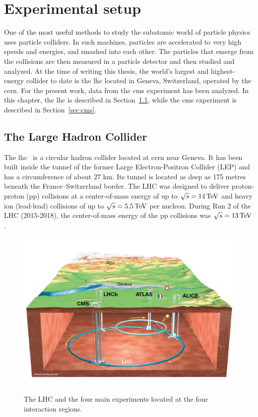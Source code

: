 \chapter{Experimental setup}
\label{sec:experimental-setup}

One of the most useful methods to study the subatomic world of particle physics uses particle colliders. In such machines, particles are accelerated to very high speeds and energies, and smashed into each other. The particles that emerge from the collisions are then measured in a particle detector and then studied and analyzed. At the time of writing this thesis, the world's largest and highest-energy collider to date is the \gls{lhc} located in Geneva, Switzerland, operated by the \gls{cern}. For the present work, data from the \gls{cms} experiment has been analyzed. In this chapter, the \gls{lhc} is described in Section~\ref{sec:lhc}, while the \gls{cms} experiment is described in Section~\ref{sec:cms}. 

\section{The Large Hadron Collider}
\label{sec:lhc}

The \gls{lhc}~\cite{Bruning:2004ej, Buning:2004wk,Benedikt:2004wm} is a circular hadron collider located at \gls{cern} near Geneva. It has been built inside the tunnel of the former Large Electron-Positron Collider (LEP) and has a circumference of about 27 km. Its tunnel is located as deep as 175 metres beneath the France–Switzerland border. The LHC was designed to deliver proton-proton (pp) collisions at a center-of-mass energy of up to $\sqrt{s} = 14\,\text{Te\hspace{-.08em}V}$ and heavy ion (lead-lead) collisions of up to $\sqrt{s} = 5.5\,\text{Te\hspace{-.08em}V}$ per nucleon. During Run 2 of the LHC (2015-2018), the center-of-mass energy of the pp collisions was $\sqrt{s} = 13\,\text{Te\hspace{-.08em}V}$.

\begin{figure}[!htb]
\centering
\includegraphics[width=0.75\linewidth]{plots/detector/LHC_overview.png}  \\
\caption[LHC overview]{The LHC and the four main experiments located at the four interaction regions.}
\label{fig:lhc-overview}
\end{figure}

